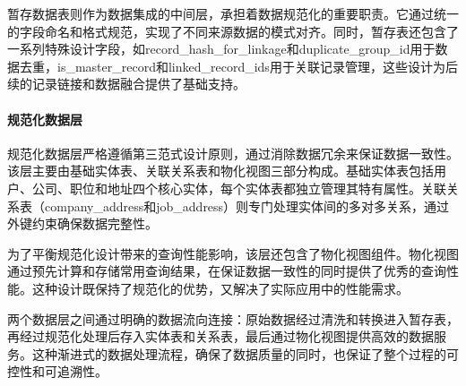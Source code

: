 暂存数据表则作为数据集成的中间层，承担着数据规范化的重要职责。它通过统一的字段命名和格式规范，实现了不同来源数据的模式对齐。同时，暂存表还包含了一系列特殊设计字段，如record\_hash\_for\_linkage和duplicate\_group\_id用于数据去重，is\_master\_record和linked\_record\_ids用于关联记录管理，这些设计为后续的记录链接和数据融合提供了基础支持。

\paragraph{规范化数据层}
规范化数据层严格遵循第三范式设计原则，通过消除数据冗余来保证数据一致性。该层主要由基础实体表、关联关系表和物化视图三部分构成。基础实体表包括用户、公司、职位和地址四个核心实体，每个实体表都独立管理其特有属性。关联关系表（company\_address和job\_address）则专门处理实体间的多对多关系，通过外键约束确保数据完整性。

为了平衡规范化设计带来的查询性能影响，该层还包含了物化视图组件。物化视图通过预先计算和存储常用查询结果，在保证数据一致性的同时提供了优秀的查询性能。这种设计既保持了规范化的优势，又解决了实际应用中的性能需求。

两个数据层之间通过明确的数据流向连接：原始数据经过清洗和转换进入暂存表，再经过规范化处理后存入实体表和关系表，最后通过物化视图提供高效的数据服务。这种渐进式的数据处理流程，确保了数据质量的同时，也保证了整个过程的可控性和可追溯性。
